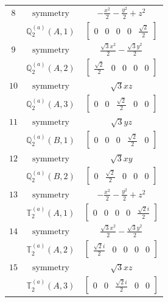 \documentclass[fleqn,8pt,landscape]{jsarticle}
\begin{document}
\begin{longtable}{ccc}
$ 8 $ & $ \text{symmetry} $ & $ - \frac{x^{2}}{2} - \frac{y^{2}}{2} + z^{2} $ \\
$  $ & $ \mathbb{Q}_{2}^{(a)}(A,1) $ & $ \begin{bmatrix} 0 & 0 & 0 & 0 & \frac{\sqrt{2}}{2} \end{bmatrix} $ \\ \hline
$ 9 $ & $ \text{symmetry} $ & $ \frac{\sqrt{3} x^{2}}{2} - \frac{\sqrt{3} y^{2}}{2} $ \\
$  $ & $ \mathbb{Q}_{2}^{(a)}(A,2) $ & $ \begin{bmatrix} \frac{\sqrt{2}}{2} & 0 & 0 & 0 & 0 \end{bmatrix} $ \\ \hline
$ 10 $ & $ \text{symmetry} $ & $ \sqrt{3} x z $ \\
$  $ & $ \mathbb{Q}_{2}^{(a)}(A,3) $ & $ \begin{bmatrix} 0 & 0 & \frac{\sqrt{2}}{2} & 0 & 0 \end{bmatrix} $ \\ \hline
$ 11 $ & $ \text{symmetry} $ & $ \sqrt{3} y z $ \\
$  $ & $ \mathbb{Q}_{2}^{(a)}(B,1) $ & $ \begin{bmatrix} 0 & 0 & 0 & \frac{\sqrt{2}}{2} & 0 \end{bmatrix} $ \\ \hline
$ 12 $ & $ \text{symmetry} $ & $ \sqrt{3} x y $ \\
$  $ & $ \mathbb{Q}_{2}^{(a)}(B,2) $ & $ \begin{bmatrix} 0 & \frac{\sqrt{2}}{2} & 0 & 0 & 0 \end{bmatrix} $ \\ \hline
$ 13 $ & $ \text{symmetry} $ & $ - \frac{x^{2}}{2} - \frac{y^{2}}{2} + z^{2} $ \\
$  $ & $ \mathbb{T}_{2}^{(a)}(A,1) $ & $ \begin{bmatrix} 0 & 0 & 0 & 0 & \frac{\sqrt{2} i}{2} \end{bmatrix} $ \\ \hline
$ 14 $ & $ \text{symmetry} $ & $ \frac{\sqrt{3} x^{2}}{2} - \frac{\sqrt{3} y^{2}}{2} $ \\
$  $ & $ \mathbb{T}_{2}^{(a)}(A,2) $ & $ \begin{bmatrix} \frac{\sqrt{2} i}{2} & 0 & 0 & 0 & 0 \end{bmatrix} $ \\ \hline
$ 15 $ & $ \text{symmetry} $ & $ \sqrt{3} x z $ \\
$  $ & $ \mathbb{T}_{2}^{(a)}(A,3) $ & $ \begin{bmatrix} 0 & 0 & \frac{\sqrt{2} i}{2} & 0 & 0 \end{bmatrix} $ \\ \hline

\end{longtable}
\end{document}
